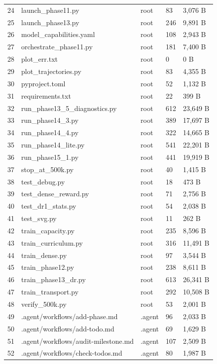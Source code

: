 \documentclass[11pt,a4paper,oneside]{book}
\begin{document}
\begin{longtable}{l l l l l}
24 & launch\_phase11.py & root & 83 & 3,076 B \\
25 & launch\_phase13.py & root & 246 & 9,891 B \\
26 & model\_capabilities.yaml & root & 108 & 2,943 B \\
27 & orchestrate\_phase11.py & root & 181 & 7,400 B \\
28 & plot\_err.txt & root & 0 & 0 B \\
29 & plot\_trajectories.py & root & 83 & 4,355 B \\
30 & pyproject.toml & root & 52 & 1,132 B \\
31 & requirements.txt & root & 22 & 399 B \\
32 & run\_phase13\_5\_diagnostics.py & root & 612 & 23,649 B \\
33 & run\_phase14\_3.py & root & 389 & 17,697 B \\
34 & run\_phase14\_4.py & root & 322 & 14,665 B \\
35 & run\_phase14\_lite.py & root & 541 & 22,201 B \\
36 & run\_phase15\_1.py & root & 441 & 19,919 B \\
37 & stop\_at\_500k.py & root & 40 & 1,415 B \\
38 & test\_debug.py & root & 18 & 473 B \\
39 & test\_dense\_reward.py & root & 71 & 2,756 B \\
40 & test\_dr1\_stats.py & root & 54 & 2,038 B \\
41 & test\_svg.py & root & 11 & 262 B \\
42 & train\_capacity.py & root & 235 & 8,596 B \\
43 & train\_curriculum.py & root & 316 & 11,491 B \\
44 & train\_dense.py & root & 97 & 3,544 B \\
45 & train\_phase12.py & root & 238 & 8,611 B \\
46 & train\_phase13\_dr.py & root & 613 & 26,341 B \\
47 & train\_transport.py & root & 292 & 10,508 B \\
48 & verify\_500k.py & root & 53 & 2,001 B \\
49 & .agent/workflows/add-phase.md & .agent & 96 & 2,033 B \\
50 & .agent/workflows/add-todo.md & .agent & 69 & 1,629 B \\
51 & .agent/workflows/audit-milestone.md & .agent & 107 & 2,509 B \\
52 & .agent/workflows/check-todos.md & .agent & 80 & 1,987 B \\

\end{longtable}
\end{document}
